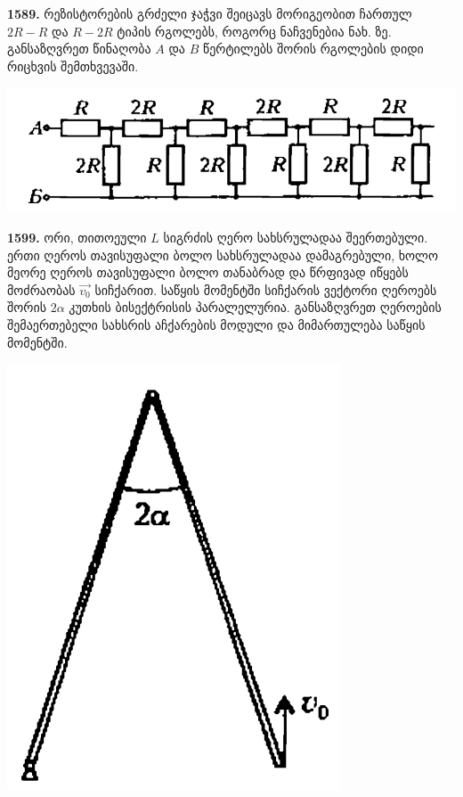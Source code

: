 \documentclass[12pt,a4paper,]{report}
\begin{document}
\textbf{1589.} რეზისტორების გრძელი ჯაჭვი შეიცავს მორიგეობით ჩართულ $2R-R$ და $R-2R$ ტიპის რგოლებს, როგორც ნაჩვენებია ნახ. ზე. განსაზღვრეთ წინაღობა $A$ და $B$ წერტილებს შორის რგოლების დიდი რიცხვის შემთხვევაში.  
		\begin{center}
			\includegraphics[scale=0.4]{images/F1589.png}
		\end{center}

\textbf{1599.} ორი, თითოეული $L$ სიგრძის ღერო სახსრულადაა შეერთებული. ერთი ღეროს თავისუფალი ბოლო სახსრულადაა დამაგრებული, ხოლო მეორე ღეროს თავისუფალი ბოლო თანაბრად და წრფივად იწყებს მოძრაობას $\vec{v_0}$ სიჩქარით. საწყის მომენტში სიჩქარის ვექტორი ღეროებს შორის $2\alpha$ კუთხის ბისექტრისის პარალელურია. განსაზღვრეთ ღეროების შემაერთებელი სახსრის აჩქარების მოდული და მიმართულება საწყის მომენტში. 
		\begin{center}
			\includegraphics[scale=0.4]{images/F1599.png}
		\end{center}
	
\end{document}
